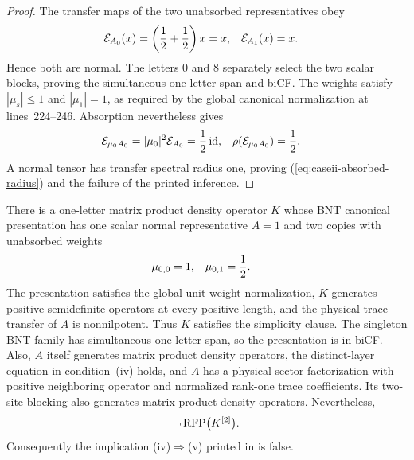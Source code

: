 \begin{proof}
    The transfer maps of the two unabsorbed representatives obey
    \begin{align}
        \mathcal E_{A_0}(x) & =
        \left(\frac12+\frac12\right)x=x,
                            & \mathcal E_{A_1}(x) & =x.
        \notag
    \end{align}
    Hence both are normal. The letters $0$ and $8$ separately select the two
    scalar blocks, proving the simultaneous one-letter span and biCF. The
    weights satisfy $|\mu_s|\leq1$ and $|\mu_1|=1$, as required by the global
    canonical normalization at lines~224--246. Absorption nevertheless gives
    \begin{align}
        \mathcal E_{\mu_0A_0}
         & =|\mu_0|^2\mathcal E_{A_0}=\frac12\,\mathrm{id},
         & \rho(\mathcal E_{\mu_0A_0})                      & =\frac12.
        \notag
    \end{align}
    A normal tensor has transfer spectral radius one, proving
    (\ref{eq:caseii-absorbed-radius}) and the failure of the printed inference.
\end{proof}

\begin{theorem}
    \label{thm:mpdo_theorem49_iv_to_v_counterexample}
    \leanok
    There is a one-letter matrix product density operator $K$ whose BNT
    canonical presentation has one scalar normal representative $A=1$ and two
    copies with unabsorbed weights
    \begin{align}
        \mu_{0,0} & =1,
                  & \mu_{0,1} & =\frac12.
        \notag
    \end{align}
    The presentation satisfies the global unit-weight normalization, $K$
    generates positive semidefinite operators at every positive length, and
    the physical-trace transfer of $A$ is nonnilpotent. Thus $K$ satisfies the
    simplicity clause. The singleton BNT family has simultaneous one-letter
    span, so the presentation is in biCF. Also, $A$ itself generates
    matrix product density operators, the distinct-layer equation in
    condition~(iv) holds, and $A$ has a physical-sector factorization with
    positive neighboring operator and normalized rank-one trace coefficients.
    Its two-site blocking also generates matrix product density operators.
    Nevertheless,
    \begin{align}
        \neg\operatorname{RFP}\bigl(K^{[2]}\bigr).
        \notag
    \end{align}
    Consequently the implication (iv)$\Rightarrow$(v) printed in
    \cite[Theorem~4.9]{Cirac2016MPDO_arXiv} is false.
\end{theorem}

